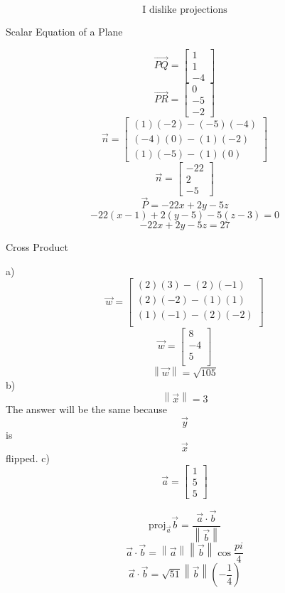 \documentclass[12pt]{article}
\newcommand{\dbarl}{\left\lVert}
\newcommand{\dbarr}{\right\rVert}
\newenvironment{problem}[2][Problem]{\begin{trivlist}
\item[\hskip \labelsep {\bfseries #1}\hskip \labelsep {\bfseries #2.}]}{\end{trivlist}}
\begin{document}
	\[\text{I dislike projections}\]
\begin{problem}{6}
	Scalar Equation of a Plane
\end{problem}
	\[\vec{ PQ} = \left[\begin{matrix}1\\1\\-4\end{matrix}\right]\]
	\[\vec{ PR} = \left[\begin{matrix}0\\-5\\-2\end{matrix}\right]\]
	\[\vec n = \left[\begin{matrix}(1)(-2) - (-5)(-4)\\(-4)(0) - (1)(-2)\\(1)(-5) - (1)(0)\end{matrix}\right]\]
	\[\vec n = \left[\begin{matrix}-22\\2\\-5\end{matrix}\right]\]
		\[\vec P = -22x + 2y -5z\]
		\[-22(x-1) + 2(y-5) -5(z-3) = 0\]
		\[-22x +2y -5z = 27\]
\begin{problem}{7}
	Cross Product
\end{problem}
a)\\
	\[\vec w = \left[\begin{matrix}(2)(3) - (2)(-1)\\(2)(-2) - (1)(1)\\(1)(-1) - (2)(-2)\\\end{matrix}\right]\]
	\[\vec w = \left[\begin{matrix}	8\\-4\\5\\\end{matrix}\right]\]
	\[\dbarl \vec w \dbarr = \sqrt{105}\]
b)\\
	\[\dbarl \vec x \dbarr = 3\]
	The answer will be the same because \[\vec y \] is \[\vec x\] flipped.
c)\\
	\[\vec a = \left[\begin{matrix}1\\5\\5\end{matrix}\right]\]
	
	\[\text{proj}_{\vec a}\vec b = \frac{\vec a \cdot \vec b}{\dbarl \vec b \dbarr}\]
	\[\vec a \cdot \vec b = \dbarl\vec a \dbarr \dbarl \vec b \dbarr \cos{\frac{pi}{4}}\]
	\[\vec a \cdot \vec b = \sqrt{51} \dbarl \vec b \dbarr (-\frac{1}{4})\]
	
\end{document}
